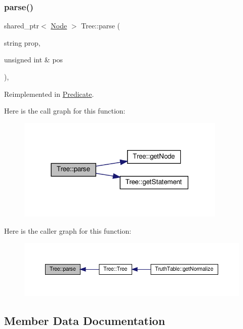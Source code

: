 \subsubsection{\texorpdfstring{parse()}{parse()}}
{\footnotesize\ttfamily shared\+\_\+ptr$<$ \hyperlink{class_node}{Node} $>$ Tree\+::parse (\begin{DoxyParamCaption}\item[{string}]{prop,  }\item[{unsigned int \&}]{pos }\end{DoxyParamCaption})\hspace{0.3cm}{\ttfamily [private]}, {\ttfamily [virtual]}}



Reimplemented in \hyperlink{class_predicate_a5c43d5efe67d0fdeae29ec38267e5acb}{Predicate}.

Here is the call graph for this function\+:\nopagebreak
\begin{figure}[H]
\begin{center}
\leavevmode
\includegraphics[width=283pt]{dd/df8/class_tree_ad05978c3b3aaa0eefed672a5129c00a1_cgraph}
\end{center}
\end{figure}
Here is the caller graph for this function\+:\nopagebreak
\begin{figure}[H]
\begin{center}
\leavevmode
\includegraphics[width=350pt]{dd/df8/class_tree_ad05978c3b3aaa0eefed672a5129c00a1_icgraph}
\end{center}
\end{figure}


\subsection{Member Data Documentation}
\mbox{\label{class_tree_a2a8e8236ffc2a6ba0ba580f4f0b01128}} 
